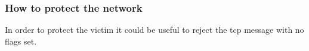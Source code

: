 \subsubsection{How to protect the network}
In order to protect the victim it could be useful to reject the tcp message with no flags set.
